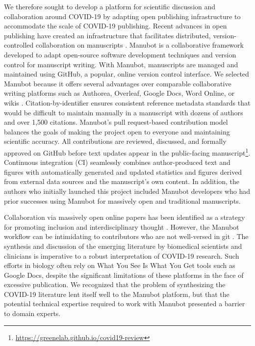 \documentclass[twocolumn]{ceurart}
\begin{document}
We therefore sought to develop a platform for scientific discussion and collaboration around COVID-19 by adapting open publishing infrastructure to accommodate the scale of COVID-19 publishing.
Recent advances in open publishing have created an infrastructure that facilitates distributed, version-controlled collaboration on manuscripts \citep{YuJbg3zO}.
Manubot \citep{YuJbg3zO} is a collaborative framework developed to adapt open-source software development techniques and version control for manuscript writing.
With Manubot, manuscripts are managed and maintained using GitHub, a popular, online version control interface.
We selected Manubot because it offers several advantages over comparable collaborative writing platforms such as Authorea, Overleaf, Google Docs, Word Online, or wikis \citep{YuJbg3zO}.
Citation-by-identifier ensures consistent reference metadata standards that would be difficult to maintain manually in a manuscript with dozens of authors and over 1,500 citations.
Manubot's pull request-based contribution model balances the goals of making the project open to everyone and maintaining scientific accuracy.
All contributions are reviewed, discussed, and formally approved on GitHub before text updates appear in the public-facing manuscript\footnote{\url{https://greenelab.github.io/covid19-review}}.
Continuous integration (CI) seamlessly combines author-produced text and figures with automatically generated and updated statistics and figures derived from external data sources and the manuscript's own content.
In addition, the authors who initially launched this project included Manubot developers who had prior successes using Manubot for massively open and traditional manuscripts.

Collaboration via massively open online papers has been identified as a strategy for promoting inclusion and interdisciplinary thought \citep{PoDz2q0A}.
However, the Manubot workflow can be intimidating to contributors who are not well-versed in git \citep{PoDz2q0A}.
The synthesis and discussion of the emerging literature by biomedical scientists and clinicians is imperative to a robust interpretation of COVID-19 research.
Such efforts in biology often rely on What You See Is What You Get tools such as Google Docs, despite the significant limitations of these platforms in the face of excessive publication.
We recognized that the problem of synthesizing the COVID-19 literature lent itself well to the Manubot platform, but that the potential technical expertise required to work with Manubot presented a barrier to domain experts.
\end{document}
